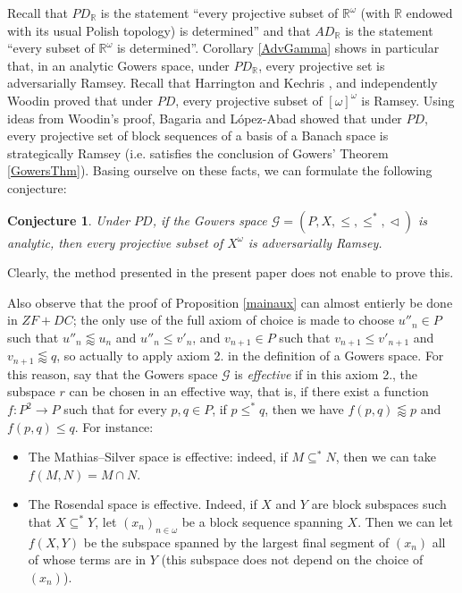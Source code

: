 \documentclass[a4paper,11pt]{article}
\newtheorem{conj}[thm]{Conjecture}
\theoremstyle{definition}
\numberwithin{equation}{section}
\newcommand{\R}{\mathbb{R}}
\newcommand{\elinf}{[\omega]^\omega}
\newcommand{\G}{\mathcal{G}}
\begin{document}
\smallskip

Recall that $PD_\R$ is the statement ``every projective subset of $\R^\omega$ (with $\R$ endowed with its usual Polish topology) is determined'' and that $AD_\R$ is the statement ``every subset of $\R^\omega$ is determined''. Corollary \ref{AdvGamma} shows in particular that, in an analytic Gowers space, under $PD_\R$, every projective set is adversarially Ramsey. Recall that Harrington and Kechris \cite{harringtonkechris}, and independently Woodin \cite{Woodin} proved that under $PD$, every projective subset of $\elinf$ is Ramsey. Using ideas from Woodin's proof, Bagaria and L\'opez-Abad \cite{BagariaLopezAbad2} showed that under $PD$, every projective set of block sequences of a basis of a Banach space is strategically Ramsey (i.e. satisfies the conclusion of Gowers' Theorem \ref{GowersThm}). Basing ourselve on these facts, we can formulate the following conjecture:

\begin{conj}

Under $PD$, if the Gowers space $\G = (P, X, \leqslant, \leqslant^*, \vartriangleleft)$ is analytic, then every projective subset of $X^\omega$ is adversarially Ramsey.

\end{conj}

Clearly, the method presented in the present paper does not enable to prove this.

\smallskip

Also observe that the proof of Proposition \ref{mainaux} can almost entierly be done in $ZF + DC$; the only use of the full axiom of choice is made to choose $u''_n \in P$ such that $u''_n \lessapprox u_n$ and $u''_n \leqslant v'_n$, and $v_{n + 1} \in P$ such that $v_{n + 1} \leqslant v'_{n +1}$ and $v_{n + 1} \lessapprox q$, so actually to apply axiom 2. in the definition of a Gowers space. For this reason, say that the Gowers space $\mathcal{G}$ is \emph{effective} if in this axiom 2., the subspace $r$ can be chosen in an effective way, that is, if there exist a function $f : P^2 \longrightarrow P$ such that for every $p, q \in P$, if $p \leqslant^* q$, then we have $f(p, q) \lessapprox p$ and $f(p, q) \leqslant q$. For instance:

\begin{itemize}

\item The Mathias--Silver space is effective: indeed, if $M \subseteq^* N$, then we can take $f(M, N) = M \cap N$.


\item The Rosendal space is effective. Indeed, if $X$ and $Y$ are block subspaces such that $X \subseteq^* Y$, let $(x_n)_{n \in \omega}$ be a block sequence spanning $X$. Then we can let $f(X, Y)$ be the subspace spanned by the largest final segment of $(x_n)$ all of whose terms are in $Y$ (this subspace does not depend on the choice of $(x_n)$).

\end{itemize}
\end{document}
